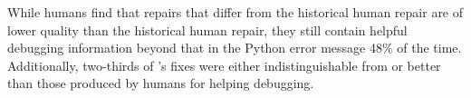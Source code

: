 \begin{framed}
  \noindent 
While humans find that \toolname repairs that differ from the historical human repair are 
of lower quality than the historical human repair, they still contain helpful 
debugging information beyond that in the Python error message 48\% of the time. 
Additionally, two-thirds of \toolname's fixes were either indistinguishable from
or better than those produced by humans for helping debugging.
\end{framed}
